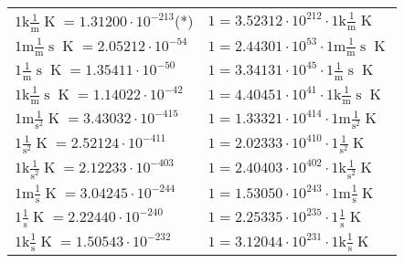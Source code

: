\begin{center}
\begin{longtable}{l l}
{\color{gray}$1 \bm{\mathrm{ k}}\frac1{\operatorname{m}}{}{}{\operatorname{K}} = 1.31200\cdot10^{-213} $}\quad(*) & {\color{gray}$ 1 = 3.52312\cdot10^{212} \cdot 1 \bm{\mathrm{ k}}\frac1{\operatorname{m}}{}{}{\operatorname{K}}$}  \\
{\color{gray}$1 \bm{\mathrm{ m}}\frac1{\operatorname{m}}{\operatorname{s}}{}{\operatorname{K}} = 2.05212\cdot10^{-54} $}   & {\color{gray}$ 1 = 2.44301\cdot10^{53} \cdot 1 \bm{\mathrm{ m}}\frac1{\operatorname{m}}{\operatorname{s}}{}{\operatorname{K}}$}  \\
{\color{black}$1 \bm{\mathrm{ }}\frac1{\operatorname{m}}{\operatorname{s}}{}{\operatorname{K}} = 1.35411\cdot10^{-50} $}   & {\color{black}$ 1 = 3.34131\cdot10^{45} \cdot 1 \bm{\mathrm{ }}\frac1{\operatorname{m}}{\operatorname{s}}{}{\operatorname{K}}$}  \\
{\color{gray}$1 \bm{\mathrm{ k}}\frac1{\operatorname{m}}{\operatorname{s}}{}{\operatorname{K}} = 1.14022\cdot10^{-42} $}   & {\color{gray}$ 1 = 4.40451\cdot10^{41} \cdot 1 \bm{\mathrm{ k}}\frac1{\operatorname{m}}{\operatorname{s}}{}{\operatorname{K}}$}  \\
{\color{gray}$1 \bm{\mathrm{ m}}{}\frac1{\operatorname{s}^2}{}{\operatorname{K}} = 3.43032\cdot10^{-415} $}   & {\color{gray}$ 1 = 1.33321\cdot10^{414} \cdot 1 \bm{\mathrm{ m}}{}\frac1{\operatorname{s}^2}{}{\operatorname{K}}$}  \\
{\color{black}$1 \bm{\mathrm{ }}{}\frac1{\operatorname{s}^2}{}{\operatorname{K}} = 2.52124\cdot10^{-411} $}   & {\color{black}$ 1 = 2.02333\cdot10^{410} \cdot 1 \bm{\mathrm{ }}{}\frac1{\operatorname{s}^2}{}{\operatorname{K}}$}  \\
{\color{gray}$1 \bm{\mathrm{ k}}{}\frac1{\operatorname{s}^2}{}{\operatorname{K}} = 2.12233\cdot10^{-403} $}   & {\color{gray}$ 1 = 2.40403\cdot10^{402} \cdot 1 \bm{\mathrm{ k}}{}\frac1{\operatorname{s}^2}{}{\operatorname{K}}$}  \\
{\color{gray}$1 \bm{\mathrm{ m}}{}\frac1{\operatorname{s}}{}{\operatorname{K}} = 3.04245\cdot10^{-244} $}   & {\color{gray}$ 1 = 1.53050\cdot10^{243} \cdot 1 \bm{\mathrm{ m}}{}\frac1{\operatorname{s}}{}{\operatorname{K}}$}  \\
{\color{black}$1 \bm{\mathrm{ }}{}\frac1{\operatorname{s}}{}{\operatorname{K}} = 2.22440\cdot10^{-240} $}   & {\color{black}$ 1 = 2.25335\cdot10^{235} \cdot 1 \bm{\mathrm{ }}{}\frac1{\operatorname{s}}{}{\operatorname{K}}$}  \\
{\color{gray}$1 \bm{\mathrm{ k}}{}\frac1{\operatorname{s}}{}{\operatorname{K}} = 1.50543\cdot10^{-232} $}   & {\color{gray}$ 1 = 3.12044\cdot10^{231} \cdot 1 \bm{\mathrm{ k}}{}\frac1{\operatorname{s}}{}{\operatorname{K}}$}  \\

\end{longtable}
\end{center}
